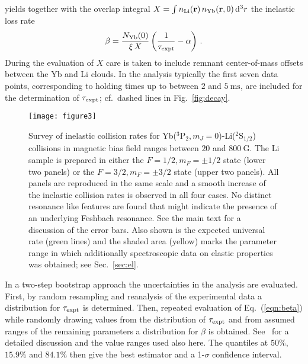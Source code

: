 \documentclass[twocolumn,superscriptaddress,showpacs,floatfix,amsmath,amssymb]{revtex4-1}
\newcommand{\triplet}{{}^3\mathrm{P}_2}
\newcommand{\Li}{{}^2\mathrm{S}_{1/2}}
\newcommand{\msec}{\mathrm{ms}}
\newcommand{\G}{\mathrm{G}}
\begin{document}
yields together with the overlap integral $X = \int n_{\rm Li}({\bf r})\,
n_{\rm Yb}({\bf r}, 0)\, {\rm d}^3r$ the inelastic loss rate
\begin{equation}
	\beta = \frac{N_{\rm Yb}(0)}{\xi\, X} \left( \frac{1}{\tau_{\rm expt}} -
	\alpha \right)\, .
	\label{eqn:beta}
\end{equation}
During the evaluation of $X$ care is taken to include remnant
center-of-mass offsets between the Yb and Li clouds. In the analysis
typically the first seven data points, corresponding to holding times up to
between $2$ and $5~\msec$, are included for the determination of $\tau_{\rm
expt}$; cf.\ dashed lines in Fig.~\ref{fig:decay}.

\begin{figure}[tb!]
	\centering
	\texttt{[image: figure3]}
	\caption{
		Survey of inelastic collision rates for Yb($\triplet, m_J = 0$)-Li($\Li$)
		collisions in magnetic bias field ranges between $20$ and $800~\G$. The Li
		sample is prepared in either the $F = 1/2, m_F = \pm 1/2$
		state (lower two panels) or the $F = 3/2, m_F = \pm 3/2$ state (upper two
		panels). All panels are reproduced in the same scale and a smooth increase
		of the inelastic collision rates is observed in all four cases. No
		distinct resonance like features are found that might indicate the
		presence of an underlying Feshbach resonance. See the main text for a
		discussion of the error bars. Also shown is the expected universal rate
		(green lines) and the shaded area (yellow) marks the parameter range in
		which additionally spectroscopic data on elastic properties was obtained;
		see Sec.~\ref{sec:el}.
	}
	\label{fig:results}
\end{figure}

In a two-step bootstrap approach the uncertainties in the analysis are
evaluated. First, by random resampling and reanalysis of the experimental data
a distribution for $\tau_{\rm expt}$ is determined. Then, repeated evaluation
of Eq.~(\ref{eqn:beta}) while randomly drawing values from the distribution of
$\tau_{\rm expt}$ and from assumed ranges of the remaining parameters a
distribution for $\beta$ is obtained. See~\cite{schafer_spin_2017} for a
detailed discussion and the value ranges used also here. The quantiles at
$50\%$, $15.9\%$ and $84.1\%$ then give the best estimator and a 1-$\sigma$
confidence interval.
\end{document}
